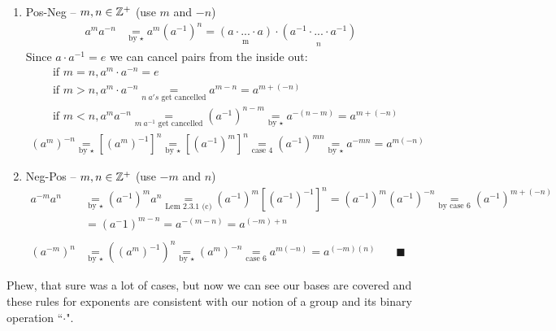 \begin{proposition}
\begin{enumerate}[label=Case \arabic*:]
\begin{align}
        (a^{-m})^{-n} &\underset{\text{by }\star\star}{=} ((a^m)^{-1})^{-n} \underset{\text{by }\star\star}{=} [((a^m)^{-1})^{-1}]^{n} \underset{\text{Lemma 2.3.1 (c)}}{=} [a^m]^n= a^{mn}= a^{(-m)(-n)} \nonumber
    \end{align}
    \item Pos-Neg -- $m,n\in {\mathbb{Z}}^+$ (use $m$ and $-n$)
    \begin{align}
        a^m a^{-n}&\underset{\text{by $\star$}}{=} a^m (a^{-1})^n = \underset{\text{m}}{(a\cdot ... \cdot a)}\cdot \underset{n}{(a^{-1}\cdot ... \cdot a^{-1})} \nonumber
    \end{align}
    Since $a\cdot a^{-1}=e$ we can cancel pairs from the inside out:
    \begin{align}
        &\text{if } m=n, a^m\cdot a^{-n}=e \nonumber \\
        &\text{if } m>n, a^m\cdot a^{-n} \underset{n \ a's\text{ get cancelled}}{=}a^{m-n}=a^{m+(-n)} \nonumber\\
        &\text{if } m<n, a^ma^{-n} \underset{m \ a^{-1} \text{ get cancelled}}{=} (a^{-1})^{n-m} \underset{\text{by $\star$}}{=} a^{-(n-m)}=a^{m+(-n)}\nonumber
    \end{align}
    \begin{align}
        (a^m)^{-n}\underset{\text{by $\star$}}{=} [(a^m)^{-1}]^n\underset{\text{by $\star$}}{=}[(a^{-1})^m]^n \underset{\text{case 4}}{=}(a^{-1})^{mn} \underset{\text{by $\star$}}{=}a^{-mn}=a^{m(-n)}\nonumber
    \end{align}
    \item Neg-Pos -- $m,n\in {\mathbb{Z}}^+$ (use $-m$ and $n$)\\
    \begin{align}
        a^{-m}a^{n}&\underset{\text{by $\star$}}{=}(a^{-1})^m a^n\underset{\text{Lem 2.3.1 (c)}}{=}(a^{-1})^m[(a^{-1})^{-1}]^n = (a^{-1})^m(a^{-1})^{-n}\underset{\text{by case 6}}{=} (a^{-1})^{m+(-n)} \nonumber \\
        &=(a^-1)^{m-n}= a^{-(m-n)}= a^{(-m)+n} \nonumber \\ \nonumber \\
        (a^{-m})^n&\underset{\text{by $\star$}}{=}((a^m)^{-1})^n\underset{\text{by $\star$}}{=}(a^m)^{-n}\underset{\text{case 6}}{=}a^{m(-n)}=a^{(-m)(n)} \ \ \ \ \ \ \ \ \blacksquare\nonumber
    \end{align}
\end{enumerate}
Phew, that sure was a lot of cases, but now we can see our bases are covered and these rules for
exponents are consistent with our notion of a group and its binary operation ``$\cdot$".
\end{proposition}

